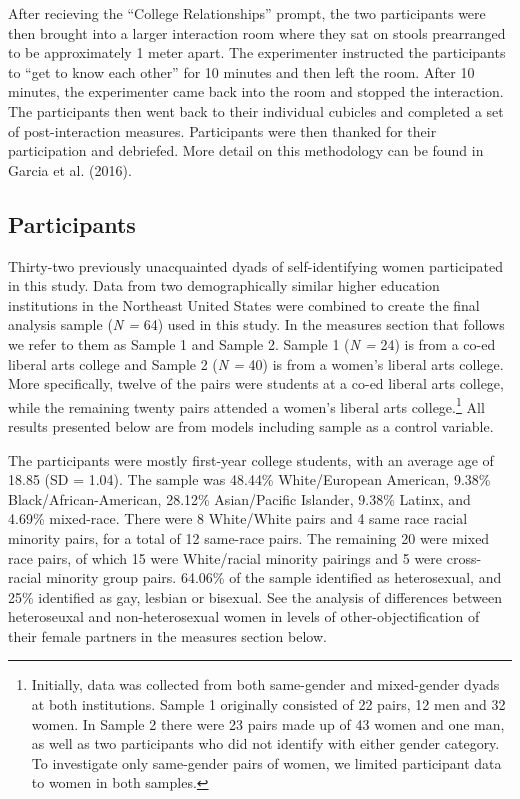\documentclass[man]{apa6}
\let\rmarkdownfootnote\footnote%
\def\footnote{\protect\rmarkdownfootnote}
\begin{document}
After recieving the \enquote{College Relationships} prompt, the two
participants were then brought into a larger interaction room where they
sat on stools prearranged to be approximately 1 meter apart. The
experimenter instructed the participants to \enquote{get to know each
other} for 10 minutes and then left the room. After 10 minutes, the
experimenter came back into the room and stopped the interaction. The
participants then went back to their individual cubicles and completed a
set of post-interaction measures. Participants were then thanked for
their participation and debriefed. More detail on this methodology can
be found in Garcia et al. (2016).

\subsection{Participants}\label{participants}

Thirty-two previously unacquainted dyads of self-identifying women
participated in this study. Data from two demographically similar higher
education institutions in the Northeast United States were combined to
create the final analysis sample (\emph{N =} 64) used in this study. In
the measures section that follows we refer to them as Sample 1 and
Sample 2. Sample 1 (\emph{N =} 24) is from a co-ed liberal arts college
and Sample 2 (\emph{N =} 40) is from a women's liberal arts college.
More specifically, twelve of the pairs were students at a co-ed liberal
arts college, while the remaining twenty pairs attended a women's
liberal arts college.\footnote{Initially, data was collected from both
  same-gender and mixed-gender dyads at both institutions. Sample 1
  originally consisted of 22 pairs, 12 men and 32 women. In Sample 2
  there were 23 pairs made up of 43 women and one man, as well as two
  participants who did not identify with either gender category. To
  investigate only same-gender pairs of women, we limited participant
  data to women in both samples.} All results presented below are from
models including sample as a control variable.

The participants were mostly first-year college students, with an
average age of 18.85 (SD = 1.04). The sample was 48.44\% White/European
American, 9.38\% Black/African-American, 28.12\% Asian/Pacific Islander,
9.38\% Latinx, and 4.69\% mixed-race. There were 8 White/White pairs and
4 same race racial minority pairs, for a total of 12 same-race pairs.
The remaining 20 were mixed race pairs, of which 15 were White/racial
minority pairings and 5 were cross-racial minority group pairs. 64.06\%
of the sample identified as heterosexual, and 25\% identified as gay,
lesbian or bisexual. See the analysis of differences between
heteroseuxal and non-heterosexual women in levels of
other-objectification of their female partners in the measures section
below.
\end{document}
